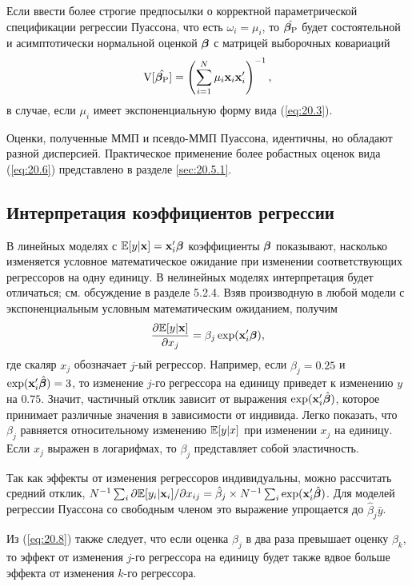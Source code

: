 Если ввести более строгие предпосылки о корректной параметрической спецификации регрессии Пуассона, что есть $\omega_i = \mu_i$, то $\hat{\bm{\beta}_{\mathrm{P}}}$ будет состоятельной и асимптотически нормальной оценкой $\bm{\beta}$ с матрицей выборочных ковариаций
    \begin{align}\label{eq:20.7}
    \mathrm{V}[\hat{\bm{\beta}_{\mathrm{P}}}] = \left( \sum^{N}_{i = 1} \mu_i \mathbf{x}_i \mathbf{x}'_i \right)^{-1},
    \end{align}
в случае, если $\mu_i$ имеет экспоненциальную форму вида (\ref{eq:20.3}).

Оценки, полученные ММП и псевдо-ММП Пуассона, идентичны, но обладают разной дисперсией. Практическое применение более робастных оценок вида (\ref{eq:20.6}) представлено в разделе \ref{sec:20.5.1}.


\subsection{Интерпретация коэффициентов регрессии}\label{sec:20.2.3}

\noindent
В линейных моделях с $\mathbb{E}[y|\mathbf{x}] = \mathbf{x}_i'\bm{\beta}$ коэффициенты $\bm{\beta}$ показывают, насколько изменяется условное математическое ожидание при изменении соответствующих регрессоров на одну единицу. В нелинейных моделях интерпретация будет отличаться; см. обсуждение в разделе 5.2.4. Взяв производную в любой модели с экспоненциальным условным математическим ожиданием, получим
    \begin{align}\label{eq:20.8}
    \frac{\partial\mathbb{E}[y|\mathbf{x}]}{\partial x_j} = \beta_j \exp(\mathbf{x}_i'\bm{\beta}),
    \end{align}
где скаляр $x_j$ обозначает $j$-ый регрессор. Например, если $\hat{\beta}_j = 0.25$ и $\exp(\mathbf{x}'_i\hat{\bm{\beta}}) = 3$, то изменение $j$-го регрессора на единицу приведет к изменению $y$ на $0.75$. Значит, частичный отклик зависит от выражения $\exp(\mathbf{x}'_i\hat{\bm{\beta}})$, которое принимает различные значения в зависимости от индивида. Легко показать, что $\beta_j$ равняется относительному изменению $\mathbb{E}[y|x]$ при изменении $x_j$ на единицу. Если $x_j$ выражен в логарифмах, то $\beta_j$ представляет собой эластичность.

Так как эффекты от изменения регрессоров индивидуальны, можно рассчитать средний отклик, $N^{-1} \sum_i \partial \mathbb{E}[y_i|\mathbf{x}_i]/\partial x_{ij} = \hat{\beta}_j \times N^{-1} \sum_i \exp(\mathbf{x}'_i\hat{\bm{\beta}})$. Для моделей регрессии Пуассона со свободным членом это выражение упрощается до $\hat{\beta}_j \bar{y}$.

Из (\ref{eq:20.8}) также следует, что если оценка $\beta_j$ в два раза превышает оценку $\beta_k$, то эффект от изменения $j$-го регрессора на единицу будет также вдвое больше эффекта от изменения $k$-го регрессора.


